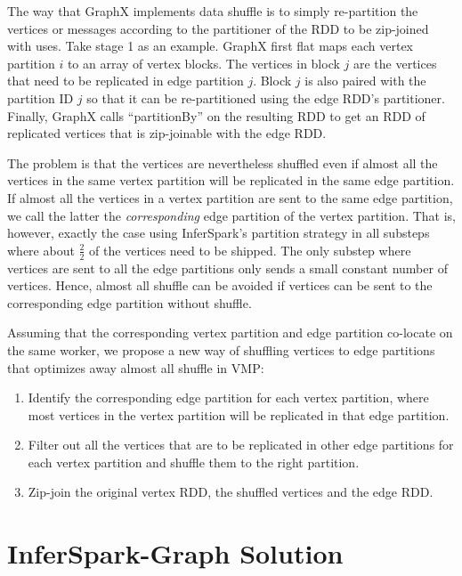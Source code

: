The way that GraphX implements data shuffle is to simply re-partition the
vertices or messages according to the partitioner of the RDD to be
zip-joined with uses. Take stage 1 as an example. GraphX first flat maps each
vertex partition $i$ to an array of vertex blocks. The vertices in block $j$
are the vertices that need to be replicated in
edge partition $j$.  Block $j$ is also paired
with the partition ID $j$ so that it can be re-partitioned using the edge
RDD's partitioner. Finally, GraphX calls ``partitionBy'' on the resulting RDD
to get an RDD of replicated vertices that is zip-joinable with the edge RDD.

The problem is that the vertices are nevertheless shuffled even if almost all
the vertices in the same vertex partition will be replicated in the same edge
partition. If almost all the vertices in a vertex partition are sent to the
same edge partition, we call the latter the \emph{corresponding} edge
partition of the vertex partition. That is, however, exactly the case using
InferSpark's partition strategy in all substeps where about $\frac{2}{2}$ of
the vertices need to be shipped. The only substep where vertices are sent to
all the edge partitions only sends a small constant number of vertices. Hence,
almost all shuffle can be avoided if vertices can be sent to the corresponding
edge partition without shuffle. 

Assuming that the corresponding vertex partition and edge partition co-locate
on the same worker, we propose a new way of shuffling vertices to edge
partitions that optimizes away almost all shuffle in VMP:
\begin{enumerate}
	\item Identify the corresponding edge partition for each vertex partition,
		where most vertices in the vertex partition will be replicated in that
		edge partition.

	\item Filter out all the vertices that are to be replicated in other edge
		partitions for each vertex partition and shuffle them to the right
		partition.

	\item Zip-join the original vertex RDD, the shuffled vertices and the edge
		RDD. 
\end{enumerate}

\section{InferSpark-Graph Solution}
\label{sec:inferspark_graph_solution}

